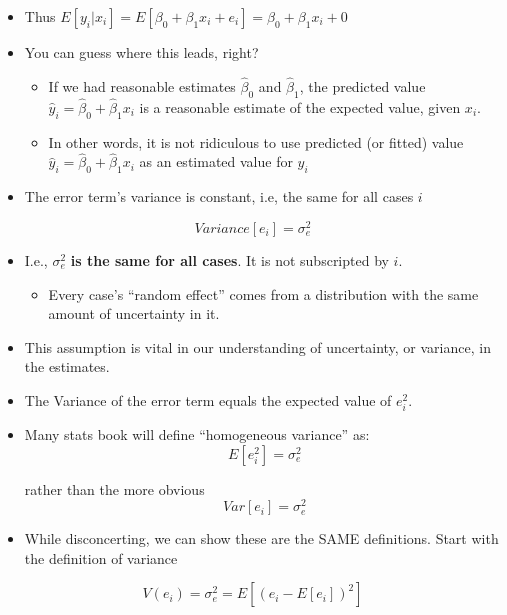 \documentclass[10pt,english]{beamer}
\def\lyxframeend{} %
\begin{document}
\begin{itemize}
\item Thus $E[y_{i}|x_{i}]=E[\beta_{0}+\beta_{1}x_{i}+e_{i}]=\beta_{0}+\beta_{1}x_{i}+0$
\item You can guess where this leads, right? 

\begin{itemize}
\item If we had reasonable estimates $\hat{\beta}_{0}$ and $\hat{\beta}_{1}$,
the predicted value $\hat{y}_{i}=\hat{\beta}_{0}+\hat{\beta}_{1}x_{i}$
is a reasonable estimate of the expected value, given $x_{i}$.
\item In other words, it is not ridiculous to use predicted (or fitted)
value $\hat{y}_{i}=\hat{\beta}_{0}+\hat{\beta}_{1}x_{i}$ as an estimated
value for $y_{i}$
\end{itemize}
\end{itemize}

\lyxframeend{}
\begin{itemize}
\item The error term's variance is constant, i.e, the same for all cases
$i$
\end{itemize}
\begin{equation}
Variance[e_{i}]=\sigma_{e}^{2}\label{eq:Varesig2}
\end{equation}

\begin{itemize}
\item I.e., $\sigma_{e}^{2}$ \textbf{is the same for all cases}. It is
not subscripted by $i$.

\begin{itemize}
\item Every case's ``random effect'' comes from a distribution with the
same amount of uncertainty in it.
\end{itemize}
\item This assumption is vital in our understanding of uncertainty, or variance,
in the estimates.
\end{itemize}

\lyxframeend{}
\begin{itemize}
\item The Variance of the error term equals the expected value of $e_{i}^{2}$.
\item Many stats book will define ``homogeneous variance'' as: 
\[
E[e_{i}^{2}]=\sigma_{e}^{2}
\]



rather than the more obvious
\begin{equation}
Var[e_{i}]=\sigma_{e}^{2}
\end{equation}


\item While disconcerting, we can show these are the SAME definitions. Start
with the definition of variance
\end{itemize}
\[
V(e_{i})=\sigma_{e}^{2}=E[(e_{i}-E[e_{i}])^{2}]
\]
\end{document}
